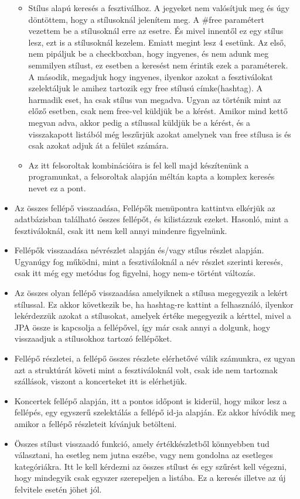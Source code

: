 \begin{itemize}
\begin{itemize}
\item Stílus alapú keresés a fesztiválhoz. A jegyeket nem valósítjuk meg és úgy döntöttem, hogy a stílusoknál jelenítem meg. A \#free paramétert vezettem be a stílusoknál erre az esetre. És mivel innentől ez egy stílus lesz, ezt is a stílusoknál kezelem. Emiatt megint lesz 4 esetünk. Az első, nem pipáljuk be a checkboxban, hogy ingyenes, és nem adunk meg semmilyen stílust, ez esetben a keresést nem érintik ezek a paraméterek. A második, megadjuk hogy ingyenes, ilyenkor azokat a fesztiválokat szelektáljuk le amihez tartozik egy free stílusú címke(hashtag). A harmadik eset, ha csak stílus van megadva. Ugyan az történik mint az előző esetben, csak nem free-vel küldjük be a kérést. Amikor mind kettő megvan adva, akkor pedig a stílussal küldjük be a kérést, és a visszakapott listából még leszűrjük azokat amelynek van free stílusa is és csak azokat adjuk át a felület számára.
\item Az itt felsoroltak kombinációira is fel kell majd készítenünk a programunkat, a felsoroltak alapján méltán kapta a komplex keresés nevet ez a pont.
\end{itemize}

\item Az összes fellépő visszaadása, Fellépők menüpontra kattintva elkérjük az adatbázisban található összes fellépőt, és kilistázzuk ezeket. Hasonló, mint a fesztiváloknál, csak itt nem kell annyi mindenre figyelnünk.

\item Fellépők visszaadása névrészlet alapján és/vagy stílus részlet alapján. Ugyanúgy fog működni, mint a fesztiváloknál a név részlet szerinti keresés, csak itt még egy metódus fog figyelni, hogy nem-e történt változás. 

\item Az összes olyan fellépő visszaadása amelyiknek a stílusa megegyezik a lekért stílussal. Ez akkor következik be, ha hashtag-re kattint a felhasználó, ilyenkor lekérdezzük azokat a stílusokat, amelyek értéke megegyezik a kérttel, mivel a JPA össze is kapcsolja a fellépővel, így már csak annyi a dolgunk, hogy visszaadjuk a stílusokhoz tartozó fellépőket.

\item Fellépő részletei, a fellépő összes részlete elérhetővé válik számunkra, ez ugyan azt a struktúrát követi mint a fesztiváloknál volt, csak ide nem tartoznak szállások, viszont a koncerteket itt is elérhetjük.

\item Koncertek fellépő alapján, itt a pontos időpont is kiderül, hogy mikor lesz a fellépés, egy egyszerű szelektálás a fellépő id-ja alapján. Ez akkor hívódik meg amikor a fellépő részleteit kívánjuk betölteni.

\item Összes stílust visszaadó funkció, amely értékkészletből könnyebben tud választani, ha esetleg nem jutna eszébe, vagy nem gondolna az esetleges kategóriákra. Itt le kell kérdezni az összes stílust és egy szűrést kell végezni, hogy mindegyik csak egyszer szerepeljen a listába. Ez a keresés illetve az új felvitele esetén jöhet jól.
\end{itemize}

